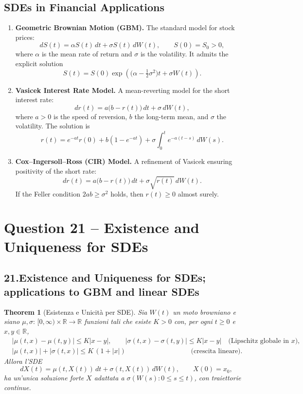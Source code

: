 \documentclass[12pt,a4paper]{book}
\newtheorem{theorem}{Theorem}[chapter]
\theoremstyle{remark}
\begin{document}
\subsection*{SDEs in Financial Applications}
\begin{enumerate}
    \item \textbf{Geometric Brownian Motion (GBM).}  
    The standard model for stock prices:
    \[
    dS(t) = \alpha S(t)\,dt + \sigma S(t)\,dW(t), \qquad S(0) = S_0 > 0,
    \]
    where $\alpha$ is the mean rate of return and $\sigma$ is the volatility.  
    It admits the explicit solution
    \[
    S(t) = S(0)\exp\!\left( \Big(\alpha - \tfrac{1}{2}\sigma^2\Big)t + \sigma W(t)\right).
    \]

    \item \textbf{Vasicek Interest Rate Model.}  
    A mean-reverting model for the short interest rate:
    \[
    dr(t) = a\big(b-r(t)\big)\,dt + \sigma\,dW(t),
    \]
    where $a > 0$ is the speed of reversion, $b$ the long-term mean, and $\sigma$ the volatility.  
    The solution is
    \[
    r(t) = e^{-at}r(0) + b(1-e^{-at}) + \sigma \int_0^t e^{-a(t-s)}\,dW(s).
    \]

    \item \textbf{Cox–Ingersoll–Ross (CIR) Model.}  
    A refinement of Vasicek ensuring positivity of the short rate:
    \[
    dr(t) = a\big(b-r(t)\big)\,dt + \sigma\sqrt{r(t)}\,dW(t).
    \]
    If the Feller condition $2ab \geq \sigma^2$ holds, then $r(t) \geq 0$ almost surely.
\end{enumerate}






\newpage
\section{Question 21 -- Existence and Uniqueness for SDEs}
\subsection*{21.\;Existence and Uniqueness for SDEs; applications to GBM and linear SDEs}

\begin{theorem}[Esistenza e Unicità per SDE]\label{thm:EU-SDE}
Sia $W(t)$ un moto browniano e siano $\mu,\sigma:\,[0,\infty)\times\mathbb{R}\to\mathbb{R}$ funzioni tali che esiste $K>0$ con, per ogni $t\ge 0$ e $x,y\in\mathbb{R}$,
\begin{align*}
&|\mu(t,x)-\mu(t,y)| \le K|x-y|, \qquad |\sigma(t,x)-\sigma(t,y)| \le K|x-y| \quad\text{(Lipschitz globale in $x$)},\\
&|\mu(t,x)|+|\sigma(t,x)| \le K\,(1+|x|) \qquad\qquad\qquad\qquad\quad\;\;\text{(crescita lineare).}
\end{align*}
Allora l'SDE
\[
dX(t)=\mu(t,X(t))\,dt+\sigma(t,X(t))\,dW(t),\qquad X(0)=x_0,
\]
ha un'unica soluzione forte $X$ adattata a $\sigma(W(s):0\le s\le t)$, con traiettorie continue. %
\end{theorem}
\end{document}
